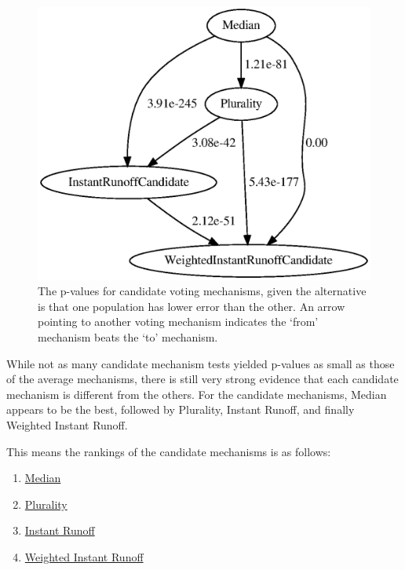 \begin{figure}[htbp]
    \centering
    \includegraphics[scale=0.75]
    {./content/figures/voting_mechanisms/candidate-mechanisms-p-values.gv}
    \caption{The p-values for candidate voting mechanisms, given the alternative is
    that one population has lower error than the other.
    An arrow pointing to another voting mechanism indicates the `from' mechanism
    beats the `to' mechanism.}
    \label{fig:candidate-mechanisms-p-values}
\end{figure}

While not as many candidate mechanism tests yielded p-values as small as those of
the average mechanisms, there is still very strong evidence that each candidate
mechanism is different from the others.
For the candidate mechanisms, Median appears to be the best, followed
by Plurality, Instant Runoff, and finally Weighted Instant Runoff.
\begin{samepage}
    This means the rankings of the candidate mechanisms is as follows:
    \begin{enumerate}
        \item \hyperref[para:median]{Median}
        \item \hyperref[para:plurality]{Plurality}
        \item \hyperref[para:cand-instant-runoff]{Instant Runoff}
        \item \hyperref[para:cand-weighted-instant-runoff]{Weighted Instant Runoff}
    \end{enumerate}
\end{samepage}


